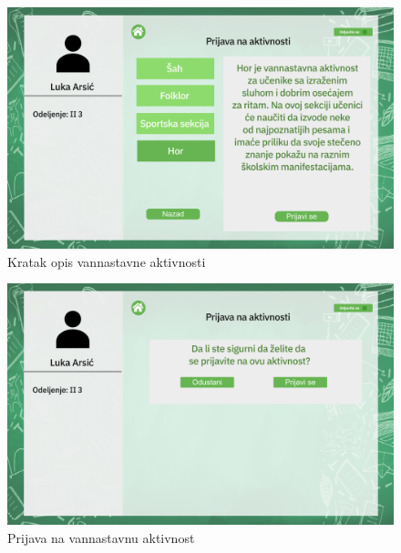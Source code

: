 \documentclass{article}
\begin{document}
\begin{figure} [!ht]
    \begin{center}
        \includegraphics[scale=0.22]{../UI/Ucenik/Student_form_activity choir.png}
    \end{center}
\caption{Kratak opis vannastavne aktivnosti}
\end{figure}

\begin{figure} [!ht]
    \begin{center}
        \includegraphics[scale=0.22]{../UI/Ucenik/Student_form_activity check.png}
    \end{center}
\caption{Prijava na vannastavnu aktivnost}
\end{figure}
\end{document}
